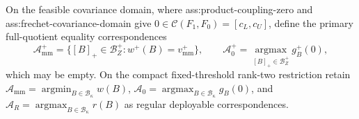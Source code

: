 On the feasible covariance domain, where ass:product-coupling-zero and ass:frechet-covariance-domain give \(0\in\mathcal C(F_1,F_0)=[c_L,c_U]\), define the primary full-quotient equality correspondences
\[
\mathcal A_{\mathrm{mm}}^+=\{[B]_+\in\mathcal B_Z^+:w^+(B)=v_{\mathrm{mm}}^+\},
\qquad
\mathcal A_0^+=\operatorname*{argmax}_{[B]_+\in\mathcal B_Z^+}g_B^+(0),
\]
which may be empty.  On the compact fixed-threshold rank-two restriction retain \(\mathcal A_{\mathrm{mm}}=\operatorname*{argmin}_{B\in\mathcal B_\kappa}w(B)\), \(\mathcal A_0=\operatorname*{argmax}_{B\in\mathcal B_\kappa}g_B(0)\), and \(\mathcal A_R=\operatorname*{argmax}_{B\in\mathcal B_\kappa}r(B)\) as regular deployable correspondences.